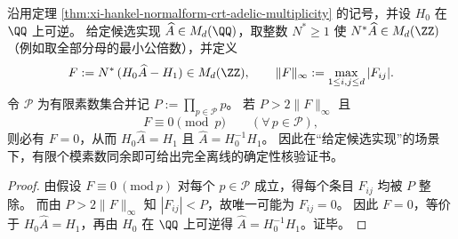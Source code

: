 \begin{proposition}\label{prop:xi-hankel-offline-modular-audit-threshold}
沿用定理 \ref{thm:xi-hankel-normalform-crt-adelic-multiplicity} 的记号，并设 \(H_0\) 在 \(\QQ\) 上可逆。
给定候选实现 \(\widehat A\in M_d(\QQ)\)，取整数 \(N^\ast\ge 1\) 使 \(N^\ast\widehat A\in M_d(\ZZ)\)（例如取全部分母的最小公倍数），并定义
\[
F:=N^\ast\,(H_0\widehat A-H_1)\in M_d(\ZZ),
\qquad
\|F\|_\infty:=\max_{1\le i,j\le d}|F_{ij}|.
\]
令 \(\mathcal P\) 为有限素数集合并记 \(P:=\prod_{p\in\mathcal P}p\)。
若 \(P>2\|F\|_\infty\) 且
\[
F\equiv 0\pmod p\qquad(\forall\,p\in\mathcal P),
\]
则必有 \(F=0\)，从而 \(H_0\widehat A=H_1\) 且 \(\widehat A=H_0^{-1}H_1\)。
因此在“给定候选实现”的场景下，有限个模素数同余即可给出完全离线的确定性核验证书。
\end{proposition}
\begin{proof}
由假设 \(F\equiv 0\ (\mathrm{mod}\ p)\) 对每个 \(p\in\mathcal P\) 成立，得每个条目 \(F_{ij}\) 均被 \(P\) 整除。
而由 \(P>2\|F\|_\infty\) 知 \(|F_{ij}|<P\)，故唯一可能为 \(F_{ij}=0\)。
因此 \(F=0\)，等价于 \(H_0\widehat A=H_1\)，再由 \(H_0\) 在 \(\QQ\) 上可逆得 \(\widehat A=H_0^{-1}H_1\)。证毕。
\end{proof}

\endinput
